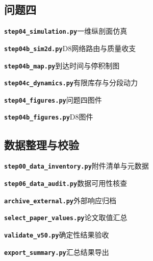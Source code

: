 \subsection*{问题四}
\noindent\textbf{\texttt{step04\_simulation.py}}\quad 一维纵剖面仿真\par\nopagebreak

\noindent\textbf{\texttt{step04b\_sim2d.py}}\quad D8网络路由与质量收支\par\nopagebreak

\noindent\textbf{\texttt{step04b\_map.py}}\quad 到达时间与停积制图\par\nopagebreak

\noindent\textbf{\texttt{step04c\_dynamics.py}}\quad 有限库存与分段动力\par\nopagebreak

\noindent\textbf{\texttt{step04\_figures.py}}\quad 问题四图件\par\nopagebreak

\noindent\textbf{\texttt{step04b\_figures.py}}\quad D8图件\par\nopagebreak


\subsection*{数据整理与校验}
\noindent\textbf{\texttt{step00\_data\_inventory.py}}\quad 附件清单与元数据\par\nopagebreak

\noindent\textbf{\texttt{step06\_data\_audit.py}}\quad 数据可用性核查\par\nopagebreak

\noindent\textbf{\texttt{archive\_external.py}}\quad 外部响应归档\par\nopagebreak

\noindent\textbf{\texttt{select\_paper\_values.py}}\quad 论文取值汇总\par\nopagebreak

\noindent\textbf{\texttt{validate\_v50.py}}\quad 确定性结果验收\par\nopagebreak

\noindent\textbf{\texttt{export\_summary.py}}\quad 汇总结果导出\par\nopagebreak


